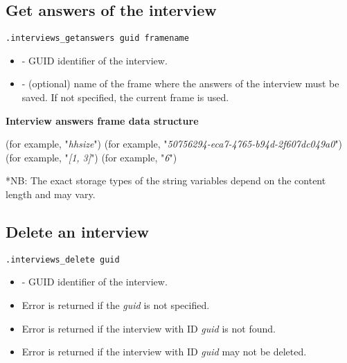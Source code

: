 \subsection{Get answers of the interview}
\begin{lstlisting}[style=CommandLineStyle]
.interviews_getanswers guid framename
\end{lstlisting}
\paramsheader
\begin{itemize}
    \item {} - GUID identifier of the interview.
    \item {} - (optional) name of the frame where the answers
          of the interview must be saved. If not specified, the current frame
          is used.
\end{itemize}
\textbf{Interview answers frame data structure}
\begin{compactitem}
     (for example, "\textit{hhsize}")
     (for example, "\textit{50756294-eca7-4765-b94d-2f607dc049a0}")
     (for example, "\textit{[1, 3]}")
     (for example, "\textit{6}")
\end{compactitem}

*NB: The exact storage types of the string variables depend on the content
     length and may vary.

\subsection{Delete an interview}
\begin{lstlisting}[style=CommandLineStyle]
.interviews_delete guid
\end{lstlisting}
\paramsheader
\begin{itemize}
    \item {} - GUID identifier of the interview.
\end{itemize}
\errheader
\begin{itemize}
    \item Error  is returned if the \textit{guid} is not specified.
    \item Error  is returned if the interview with ID \textit{guid} is not found.
    \item Error  is returned if the interview with ID \textit{guid} may not be deleted.
\end{itemize}

